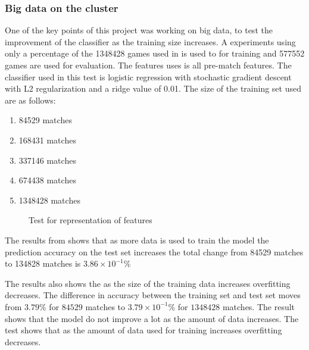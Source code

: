 \subsubsection{Big data on the cluster}
One of the key points of this project was working on big data, to test the improvement of the classifier as the training size increases. A experiments using only a percentage of the 1348428 games used in  is used to for training and 577552 games are used for evaluation. The features uses is all pre-match features. The classifier used in this test is logistic regression with stochastic gradient descent with L2 regularization and a ridge value of 0.01. The size of the training set used are as follows: 
\begin{enumerate}
\item 84529 matches
\item 168431 matches 
\item 337146 matches 
\item 674438 matches
\item 1348428 matches 
\end{enumerate}
\begin{figure}[!htb]
  \centering
{}
  \caption{Test for representation of features}\label{fig:clusterbigdata}
\end{figure}
The results from  shows that as more data is used to train the model the prediction accuracy on the test set increases the total change from 84529 matches to 134828 matches is $3.86\times10^{-1}\%$

The results also shows the as the size of the training data increases overfitting decreases. The difference in accuracy between the training set and test set moves from $3.79\%$ for $84529$ matches to $3.79\times10^{-1} \%$ for $1348428$ matches. The result shows that the model do not improve a lot as the amount of data increases. The test shows that as the amount of data used for training increases overfitting decreases.      
